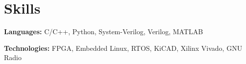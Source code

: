 \documentclass[letterpaper,11pt]{article}
\newcommand{\resumeSubHeadingListStart}{\begin{itemize}[leftmargin=0.15in, label={}]}
\newcommand{\resumeSubHeadingListEnd}{\end{itemize}}
\begin{document}



\section{Skills}
  \vspace{2pt}
  \resumeSubHeadingListStart
    \small{\item{

        \textbf{Languages:}{ C/C++, Python, System-Verilog, Verilog, MATLAB} \\ \vspace{3pt}

        \textbf{Technologies:}{ FPGA, Embedded Linux, RTOS, KiCAD, Xilinx Vivado, GNU Radio} \\ \vspace{3pt}

    }}
  \resumeSubHeadingListEnd







\end{document}
